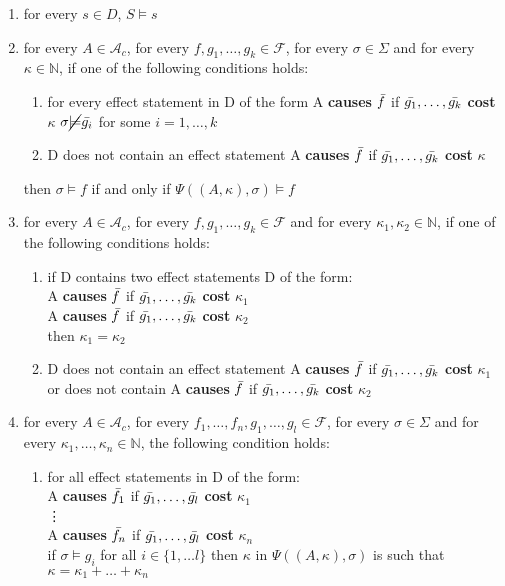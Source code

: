 \documentclass[a4paper]{article}
\begin{document}
\begin{enumerate}
    \item for every $s \in D$, $S \models s$
    \item for every $A\in\mathcal{A}_c$, for every $f,g_1,\dotsc,g_k\in\mathcal{F}$, for every $\sigma\in\Sigma$ and for every $\kappa \in \mathbb{N}$, if one of the following conditions holds:
    \begin{enumerate}[label=(\alph*)]
        \item for every effect statement in D of the form A \textbf{causes} $\Bar{f}$ if $\Bar{g_1},\dotsc,\Bar{g_k}$ \textbf{cost} $\kappa$ $\sigma \cancel{\models} \Bar{g_i}$ for some $i = 1,\dotsc,k$
        \item D does not contain an effect statement A \textbf{causes} $\Bar{f}$ if $\Bar{g_1},\dotsc,\Bar{g_k}$ \textbf{cost} $\kappa$
    \end{enumerate}
    then $\sigma\models f$ if and only if $\Psi((A,\kappa),\sigma) \models f$
    \item for every $A\in\mathcal{A}_c$, for every $f,g_1,\dotsc,g_k\in\mathcal{F}$ and for every $\kappa_1,\kappa_2 \in \mathbb{N}$, if one of the following conditions holds:
    \begin{enumerate}[label=(\alph*)]
        \item if D contains two effect statements D of the form: \\ 
        A \textbf{causes} $\Bar{f}$ if $\Bar{g_1},\dotsc,\Bar{g_k}$ \textbf{cost} $\kappa_1$ \\
        A \textbf{causes} $\Bar{f}$ if $\Bar{g_1},\dotsc,\Bar{g_k}$ \textbf{cost} $\kappa_2$ \\
        then $\kappa_1 = \kappa_2$ 
        \item D does not contain an effect statement A \textbf{causes} $\Bar{f}$ if $\Bar{g_1},\dotsc,\Bar{g_k}$ \textbf{cost} $\kappa_1$ or does not contain A \textbf{causes} $\Bar{f}$ if $\Bar{g_1},\dotsc,\Bar{g_k}$ \textbf{cost} $\kappa_2$
    \end{enumerate}
    \item for every $A\in\mathcal{A}_c$, for every $f_1,\dotsc,f_n,g_1,\dotsc,g_l\in\mathcal{F}$, for every $\sigma\in\Sigma$ and for every $\kappa_1,\dotsc,\kappa_n \in \mathbb{N}$, the following condition holds:
    \begin{enumerate}[label=(\alph*)]
        \item for all effect statements in D of the form: \\ 
        A \textbf{causes} $\Bar{f_1}$ if $\Bar{g_1},\dotsc,\Bar{g_l}$ \textbf{cost} $\kappa_1$ \\
        \vdots 
        \\
        A \textbf{causes} $\Bar{f_n}$ if $\Bar{g_1},\dotsc,\Bar{g_l}$ \textbf{cost} $\kappa_n$ \\ 
        if $\sigma\models g_i$ for all $i\in\{1,\dotsc l\}$ then $\kappa$ in $\Psi((A,\kappa),\sigma)$ is such that $\kappa = \kappa_1 + \dotsc + \kappa_n$ 
    \end{enumerate}
\end{enumerate}
%
\end{document}
